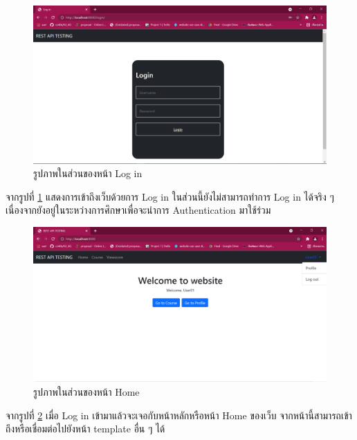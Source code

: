 \begin{figure}[!thb]
	\captionsetup{justification=centering}
	\centering
	\includegraphics[width=5in]{figures/login.png}
	\caption{รูปภาพในส่วนของหน้า Log in}
	\label{fig:login}
\end{figure}
\noindent จากรูปที่ \ref{fig:login} แสดงการเข้าถึงเว็บด้วยการ Log in ในส่วนนี้ยังไม่สามารถทำการ Log in ได้จริง ๆ เนื่องจากยังอยู่ในระหว่างการศึกษาเพื่อจะนำการ Authentication มาใช้ร่วม
\newline
\begin{figure}[!thb]
	\captionsetup{justification=centering}
	\centering
	\includegraphics[width=5in]{figures/home.png}
	\caption{รูปภาพในส่วนของหน้า Home}
	\label{fig:home}
\end{figure}
\newline
จากรูปที่ \ref{fig:home} เมื่อ Log in เข้ามาแล้วจะเจอกับหน้าหลักหรือหน้า Home ของเว็บ จากหน้านี้สามารถเข้าถึงหรือเชื่อมต่อไปยังหน้า template อื่น ๆ ได้
\newpage

